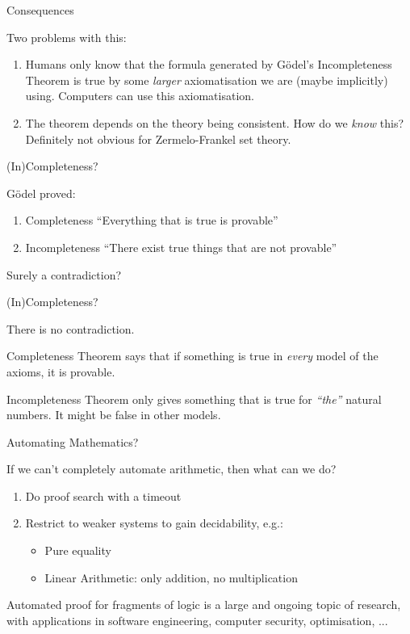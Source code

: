 \documentclass[xetex,aspectratio=169,14pt,hyperref={pdfpagelabels=true,pdflang={en-GB}}]{beamer}
\begin{document}
\begin{frame}
  {Consequences}

  Two problems with this:

  \begin{enumerate}
  \item Humans only know that the formula generated by G{\"o}del's
    Incompleteness Theorem is true by some \emph{larger}
    axiomatisation we are (maybe implicitly) using. Computers can use
    this axiomatisation.
  \item The theorem depends on the theory being consistent. How do we
    \emph{know} this? Definitely not obvious for Zermelo-Frankel set
    theory.
  \end{enumerate}
\end{frame}

\begin{frame}
  {(In)Completeness?}

  G{\"o}del proved:
  \begin{enumerate}
  \item Completeness ``Everything that is true is provable''
  \item Incompleteness ``There exist true things that are not provable''
  \end{enumerate}

  \bigskip

  Surely a contradiction?
\end{frame}

\begin{frame}
  {(In)Completeness?}

  There is no contradiction.

  \pause
  \bigskip

  Completeness Theorem says that if something is true in \emph{every}
  model of the axioms, it is provable.

  \pause
  \bigskip

  Incompleteness Theorem only gives something that is true for
  \emph{``the''} natural numbers. It might be false in other models.
\end{frame}

\begin{frame}
  {Automating Mathematics?}

  If we can't completely automate arithmetic, then what can we do?

  \begin{enumerate}
  \item Do proof search with a timeout
  \item Restrict to weaker systems to gain decidability, e.g.:
    \begin{itemize}
    \item Pure equality
    \item Linear Arithmetic: only addition, no multiplication
    \end{itemize}
  \end{enumerate}

  \bigskip

  Automated proof for fragments of logic is a large and ongoing topic
  of research, with applications in software engineering, computer
  security, optimisation, ...
\end{frame}
\end{document}
